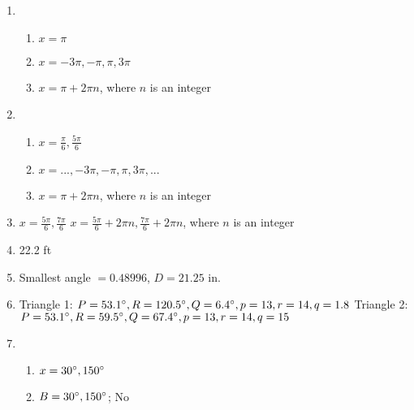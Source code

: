 \documentclass{article}
\begin{document}
\begin{enumerate}
\item

	\begin{enumerate}
	
	\item $x = \pi$
	
	\item $x = -3\pi, -\pi, \pi, 3\pi$
	
	\item $x = \pi + 2\pi n$, where $n$ is an integer
	
	\end{enumerate}
	
\item

	\begin{enumerate}
	
	\item $x = \frac{\pi}{6}, \frac{5\pi}{6}$
	
	\item $x = ..., -3\pi, -\pi, \pi, 3\pi, ...$
	
	\item $x = \pi + 2\pi n$, where $n$ is an integer
	
	\end{enumerate}
	
\item $x = \frac{5\pi}{6}, \frac{7\pi}{6}$ \newline
$x = \frac{5\pi}{6} + 2\pi n, \frac{7\pi}{6} + 2\pi n$, where $n$ is an integer

\item 22.2 ft

\item Smallest angle $= 0.48996$, $D = 21.25$ in.

\item Triangle 1: $P = 53.1\degree, R = 120.5\degree, Q = 6.4\degree, p = 13, r = 14, q = 1.8$ \newline
	Triangle 2: $P = 53.1\degree, R = 59.5\degree, Q = 67.4\degree, p = 13, r = 14, q = 15$
	
\item

	\begin{enumerate}
	
	\item $x = 30\degree, 150\degree$
	
	\item $B = 30\degree, 150\degree$; No
	
	\end{enumerate}
	

\end{enumerate}
\end{document}

